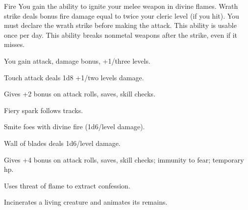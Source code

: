{Fire}
{You gain the ability to ignite your melee weapon in divine flames. Wrath strike deals bonus fire damage equal to twice your cleric level (if you hit). You must declare the wrath strike before making the attack. This ability is usable once per day. This ability breaks nonmetal weapons after the strike, even if it misses.}
{
	\item {} You gain attack, damage bonus, +1/three levels.
	\item {} Touch attack deals 1d8 +1/two levels damage.
	\item {} Gives +2 bonus on attack rolls, saves, skill checks.
	\item {} Fiery spark follows tracks.
	\item {} Smite foes with divine fire (1d6/level damage).
	\item {} Wall of blades deals 1d6/level damage.
	\item {} Gives +4 bonus on attack rolls, saves, skill checks; immunity to fear; temporary hp.
	\item {} Uses threat of flame to extract confession.
	\item {} Incinerates a living creature and animates its remains.
}